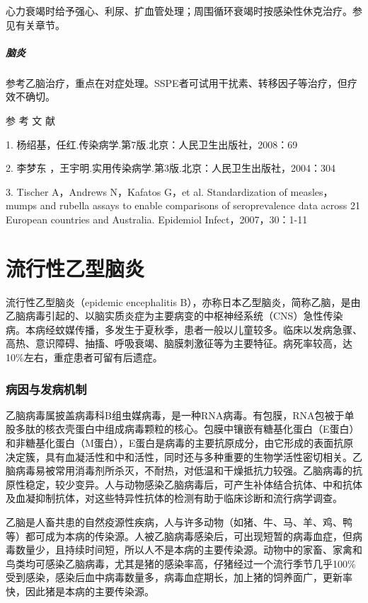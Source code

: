 心力衰竭时给予强心、利尿、扩血管处理；周围循环衰竭时按感染性休克治疗。参见有关章节。

\paragraph{脑炎}

参考乙脑治疗，重点在对症处理。SSPE者可试用干扰素、转移因子等治疗，但疗效不确切。

\protect\hypertarget{text00218.html}{}{}

\hypertarget{text00218.htmlux5cux23CHP7-4-4}{}
参 考 文 献

1. 杨绍基，任红.传染病学.第7版.北京：人民卫生出版社，2008：69

2. 李梦东 ，王宇明.实用传染病学.第3版.北京：人民卫生出版社，2004：304

3. Tischer A，Andrews N，Kafatos G，et al. Standardization of
measles，mumps and rubella assays to enable comparisons of
seroprevalence data across 21 European countries and Australia.
Epidemiol Infect，2007，30：1-11

\protect\hypertarget{text00219.html}{}{}

\chapter{流行性乙型脑炎}

流行性乙型脑炎（epidemic encephalitis
B），亦称日本乙型脑炎，简称乙脑，是由乙脑病毒引起的、以脑实质炎症为主要病变的中枢神经系统（CNS）急性传染病。本病经蚊媒传播，多发生于夏秋季，患者一般以儿童较多。临床以发病急骤、高热、意识障碍、抽搐、呼吸衰竭、脑膜刺激征等为主要特征。病死率较高，达10\%左右，重症患者可留有后遗症。

\subsection{病因与发病机制}

乙脑病毒属披盖病毒科B组虫媒病毒，是一种RNA病毒。有包膜，RNA包被于单股多肽的核衣壳蛋白中组成病毒颗粒的核心。包膜中镶嵌有糖基化蛋白（E蛋白）和非糖基化蛋白（M蛋白），E蛋白是病毒的主要抗原成分，由它形成的表面抗原决定簇，具有血凝活性和中和活性，同时还与多种重要的生物学活性密切相关。乙脑病毒易被常用消毒剂所杀灭，不耐热，对低温和干燥抵抗力较强。乙脑病毒的抗原性稳定，较少变异。人与动物感染乙脑病毒后，可产生补体结合抗体、中和抗体及血凝抑制抗体，对这些特异性抗体的检测有助于临床诊断和流行病学调查。

乙脑是人畜共患的自然疫源性疾病，人与许多动物（如猪、牛、马、羊、鸡、鸭等）都可成为本病的传染源。人被乙脑病毒感染后，可出现短暂的病毒血症，但病毒数量少，且持续时间短，所以人不是本病的主要传染源。动物中的家畜、家禽和鸟类均可感染乙脑病毒，尤其是猪的感染率高，仔猪经过一个流行季节几乎100\%受到感染，感染后血中病毒数量多，病毒血症期长，加上猪的饲养面广，更新率快，因此猪是本病的主要传染源。

